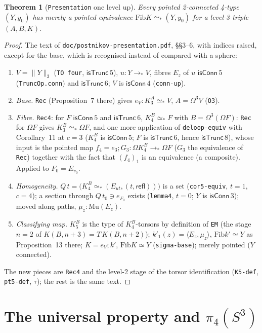 \documentclass[11pt]{amsart}
\newtheorem{theorem}{Theorem}
\theoremstyle{definition}
\theoremstyle{remark}
\newcommand{\Om}{\Omega}
\newcommand{\code}[1]{\texttt{#1}}
\newcommand{\cT}{\mathsf{isTrunc}}
\newcommand{\cC}{\mathsf{isConn}}
\newcommand{\refl}{\mathsf{refl}}
\newcommand{\Fib}{\mathrm{Fib}}
\newcommand{\tr}[1]{\|#1\|}
\begin{document}
\begin{theorem}[\code{Presentation} one level up]\label{t:pres4}
Every pointed 2-connected 4-type $(Y,y_0)$ has merely a pointed equivalence
$\Fib K\simeq_*(Y,y_0)$ for a level-3 triple $(A,B,K)$.
\end{theorem}
\begin{proof}
The text of \code{doc/postnikov-presentation.pdf}, \S\S3--6, with indices raised,
except for the base, which is recognised instead of compared with a sphere:
\begin{enumerate}
\item $V=\tr Y_3$ (\code{TO four}, $\cT\,5$), $u:Y\to_*V$, fibres $E_z$ of $u$
  $\cC\,5$ (\code{TruncOp.conn}) and $\cT\,6$; $V$ is $\cC\,4$ (\code{conn-up}).
\item \emph{Base.} \code{Rec} (Proposition~7 there) gives $e_V:K^A_3\simeq_*V$,
  $A=\Om^3V$ (\code{O3}).
\item \emph{Fibre.} \code{Rec4}: for $F$ $\cC\,5$ and $\cT\,6$, $K^B_4\simeq_*F$ with
  $B=\Om^3(\Om F)$: \code{Rec} for $\Om F$ gives $K^B_3\simeq_*\Om F$, and one more
  application of \code{deloop-equiv} with Corollary~11 at $c=3$
  ($K^B_4$ is $\cC\,5$; $F$ is $\cT\,6$, hence $\cT\,8$), whose input is the pointed map
  $f_4=e_3;G_3:\Om K^B_4\to_*\Om F$ ($G_3$ the equivalence of \code{Rec}) together with the
  fact that $(f_4)_1$ is an equivalence (a composite). Applied to $F_0=E_{v_0}$.
\item \emph{Homogeneity.} $Q\,t=\bigl(K^B_4\simeq_*(E_{ut},(t,\refl))\bigr)$ is a set
  (\code{cor5-equiv}, $t=1$, $c=4$); a section through $Q\,t_0\ni e_{F_0}$ exists
  (\code{lemma4}, $t=0$; $Y$ is $\cC\,3$); moved along paths, $\mu_z:\mathrm{Mu}(E_z)$.
\item \emph{Classifying map.} $K^B_5$ is the type of $K^B_4$-torsors by definition of
  \code{EM} (the stage $n=2$ of $K(B,n{+}3)=T\,K(B,n{+}2)$); $k'_1(z)=\langle E_z,\mu_z\rangle$,
  $\Fib k'\simeq Y$ as Proposition~13 there; $K=e_V;k'$, $\Fib K\simeq Y$
  (\code{sigma-base}); merely pointed ($Y$ connected).
\end{enumerate}
The new pieces are \code{Rec4} and the level-2 stage of the torsor
identification (\code{K5-def}, \code{pt5-def}, $\tau$); the rest is the same text.
\end{proof}

\section{The universal property and $\pi_4(S^3)$}
\end{document}
